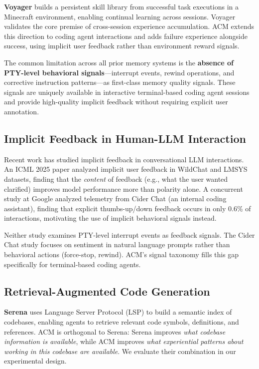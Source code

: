 \documentclass[conference]{IEEEtran}
\begin{document}
\textbf{Voyager} \cite{Wang2023Voyager} builds a persistent skill library from successful task executions in a Minecraft environment, enabling continual learning across sessions. Voyager validates the core premise of cross-session experience accumulation. ACM extends this direction to coding agent interactions and adds failure experience alongside success, using implicit user feedback rather than environment reward signals.

The common limitation across all prior memory systems is the \textbf{absence of PTY-level behavioral signals}---interrupt events, rewind operations, and corrective instruction patterns---as first-class memory quality signals. These signals are uniquely available in interactive terminal-based coding agent sessions and provide high-quality implicit feedback without requiring explicit user annotation.

\subsection{Implicit Feedback in Human-LLM Interaction}

Recent work has studied implicit feedback in conversational LLM interactions. An ICML 2025 paper \cite{Liu2025ImplicitFeedback} analyzed implicit user feedback in WildChat and LMSYS datasets, finding that the \emph{content} of feedback (e.g., what the user wanted clarified) improves model performance more than polarity alone. A concurrent study at Google \cite{Nam2025CiderChat} analyzed telemetry from Cider Chat (an internal coding assistant), finding that explicit thumbs-up/down feedback occurs in only 0.6\% of interactions, motivating the use of implicit behavioral signals instead.

Neither study examines PTY-level interrupt events as feedback signals. The Cider Chat study focuses on sentiment in natural language prompts rather than behavioral actions (force-stop, rewind). ACM's signal taxonomy fills this gap specifically for terminal-based coding agents.

\subsection{Retrieval-Augmented Code Generation}

\textbf{Serena} \cite{OraiosAI2025Serena} uses Language Server Protocol (LSP) to build a semantic index of codebases, enabling agents to retrieve relevant code symbols, definitions, and references. ACM is orthogonal to Serena: Serena improves \emph{what codebase information is available}, while ACM improves \emph{what experiential patterns about working in this codebase are available}. We evaluate their combination in our experimental design.
\end{document}
